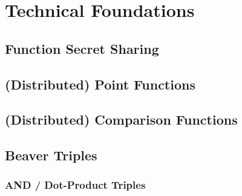 \chapter{Technical Foundations}
\label{ch:TechnicalFoundations}

\section{Function Secret Sharing}


\section{(Distributed) Point Functions}


\section{(Distributed) Comparison Functions}


\section{Beaver Triples}


\subsection{AND / Dot-Product Triples}

